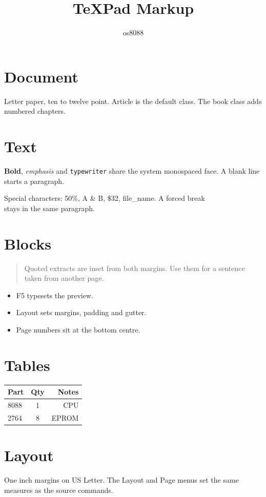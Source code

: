 \documentclass[letterpaper,12pt]{article}
\title{TeXPad Markup}
\author{os8088}
\date{}
\begin{document}
\maketitle

\section{Document}
Letter paper, ten to twelve point. Article is the default class.
The book class adds numbered chapters.

\section{Text}
\textbf{Bold}, \emph{emphasis} and \texttt{typewriter} share the
system monospaced face. A blank line starts a paragraph.

Special characters: 50\%, A \& B, \$32, file\_name.
A forced break\\ stays in the same paragraph.

\section{Blocks}
\begin{quote}
Quoted extracts are inset from both margins. Use them for a
sentence taken from another page.
\end{quote}

\begin{itemize}
\item F5 typesets the preview.
\item Layout sets margins, padding and gutter.
\item Page numbers sit at the bottom centre.
\end{itemize}

\section{Tables}
\begin{tabular}{|l|c|r|}
\hline
Part & Qty & Notes \\
\hline
8088 & 1 & CPU \\
2764 & 8 & EPROM \\
\hline
\end{tabular}

\section{Layout}
One inch margins on US Letter. The Layout and Page menus set the
same measures as the source commands.
\end{document}
